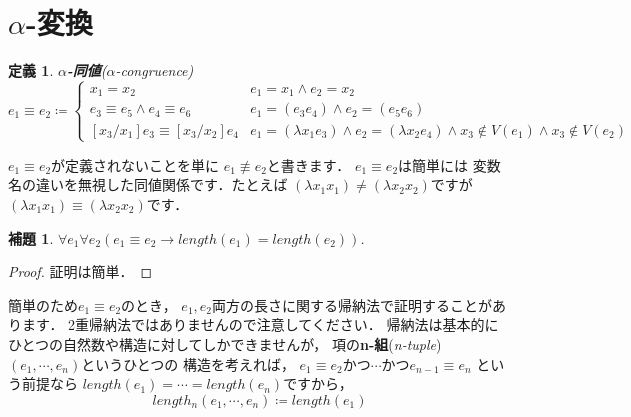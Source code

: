 \documentclass{ltjsbook}%
\newtheorem{lemma}{補題}[section]%
\newtheorem{definition}{定義}[section]%
\newcommand\term[2]{\textbf{#1}{(\textit{#2})}}%
\begin{document}
\section{$\alpha$-変換}%
\label{sect:alpha}%
\begin{definition}%
\term{$\alpha$-同値}{$\alpha$-congruence}%
\begin{equation}%
  \mathit{e}_1\equiv\mathit{e}_2 \coloneqq \begin{cases}%
    \mathit{x}_1 = \mathit{x}_2%
    & \mathit{e}_1 = \mathit{x}_1%
    \land \mathit{e}_2 = \mathit{x}_2\\%
    \mathit{e}_3\equiv\mathit{e}_5\land\mathit{e}_4\equiv\mathit{e}_6%
    & \mathit{e}_1 = (\mathit{e}_3\mathit{e}_4)%
    \land \mathit{e}_2 = (\mathit{e}_5\mathit{e}_6)\\%
    {}[\mathit{x}_3/\mathit{x}_1]\mathit{e}_3%
    \equiv{}[\mathit{x}_3/\mathit{x}_2]\mathit{e}_4%
    & \mathit{e}_1 = (\lambda\mathit{x}_1\mathit{e}_3)%
    \land \mathit{e}_2 = (\lambda\mathit{x}_2\mathit{e}_4)%
    \land \mathit{x}_3\not\in V(\mathit{e}_1)%
    \land \mathit{x}_3\not\in V(\mathit{e}_2)%
  \end{cases}%
\end{equation}%
\end{definition}%
\par$\mathit{e}_1\equiv\mathit{e}_2$が定義されないことを単に%
$\mathit{e}_1\not\equiv\mathit{e}_2$と書きます．%
$\mathit{e}_1\equiv\mathit{e}_2$は簡単には%
変数名の違いを無視した同値関係です．たとえば%
$(\lambda x_1x_1)\neq(\lambda x_2x_2)$ですが%
$(\lambda x_1x_1)\equiv(\lambda x_2x_2)$です．%
\begin{lemma}%
  \label{lemma:alpha_len}%
  $\forall\mathit{e}_1\forall\mathit{e}_2%
  (\mathit{e}_1\equiv\mathit{e}_2\rightarrow%
  length(\mathit{e}_1)=length(\mathit{e}_2))$.%
\end{lemma}%
\begin{proof}%
  証明は簡単．%
\end{proof}%
簡単のため$\mathit{e}_1\equiv\mathit{e}_2$のとき，%
$\mathit{e}_1,\mathit{e}_2$両方の長さに関する帰納法で証明することがあります．%
2重帰納法ではありませんので注意してください．%
帰納法は基本的にひとつの自然数や構造に対してしかできませんが，%
項の\term{n-組}{n-tuple}$(\mathit{e}_1,\cdots,\mathit{e}_n)$というひとつの%
構造を考えれば，%
$\mathit{e}_1\equiv\mathit{e}_2かつ\cdots%
かつ\mathit{e}_{n-1}\equiv\mathit{e}_n$%
という前提なら%
$length(\mathit{e}_1)=\cdots=length(\mathit{e}_n)$ですから，%
\begin{equation}%
  length_n(\mathit{e}_1,\cdots,\mathit{e}_n)\coloneqq%
  length(\mathit{e}_1)%
\end{equation}%
\end{document}
